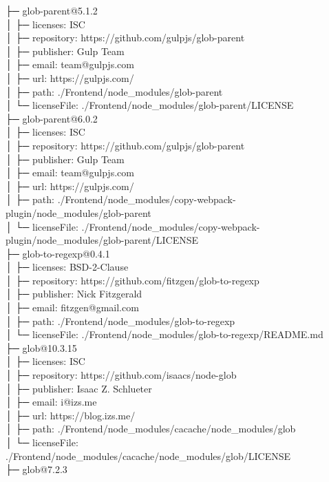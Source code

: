 ├─ glob-parent@5.1.2\\
│  ├─ licenses: ISC\\
│  ├─ repository: https://github.com/gulpjs/glob-parent\\
│  ├─ publisher: Gulp Team\\
│  ├─ email: team@gulpjs.com\\
│  ├─ url: https://gulpjs.com/\\
│  ├─ path: ./Frontend/node\_modules/glob-parent\\
│  └─ licenseFile: ./Frontend/node\_modules/glob-parent/LICENSE\\
├─ glob-parent@6.0.2\\
│  ├─ licenses: ISC\\
│  ├─ repository: https://github.com/gulpjs/glob-parent\\
│  ├─ publisher: Gulp Team\\
│  ├─ email: team@gulpjs.com\\
│  ├─ url: https://gulpjs.com/\\
│  ├─ path: ./Frontend/node\_modules/copy-webpack-plugin/node\_modules/glob-parent\\
│  └─ licenseFile: ./Frontend/node\_modules/copy-webpack-plugin/node\_modules/glob-parent/LICENSE\\
├─ glob-to-regexp@0.4.1\\
│  ├─ licenses: BSD-2-Clause\\
│  ├─ repository: https://github.com/fitzgen/glob-to-regexp\\
│  ├─ publisher: Nick Fitzgerald\\
│  ├─ email: fitzgen@gmail.com\\
│  ├─ path: ./Frontend/node\_modules/glob-to-regexp\\
│  └─ licenseFile: ./Frontend/node\_modules/glob-to-regexp/README.md\\
├─ glob@10.3.15\\
│  ├─ licenses: ISC\\
│  ├─ repository: https://github.com/isaacs/node-glob\\
│  ├─ publisher: Isaac Z. Schlueter\\
│  ├─ email: i@izs.me\\
│  ├─ url: https://blog.izs.me/\\
│  ├─ path: ./Frontend/node\_modules/cacache/node\_modules/glob\\
│  └─ licenseFile: ./Frontend/node\_modules/cacache/node\_modules/glob/LICENSE\\
├─ glob@7.2.3\\
